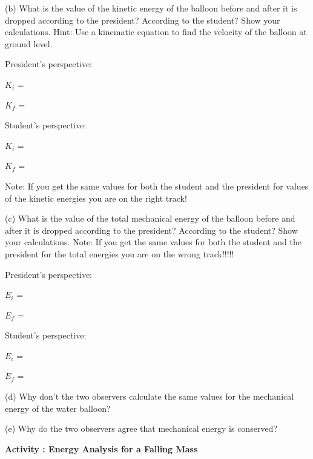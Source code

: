 (b) What is the value of the kinetic energy of the balloon before and after
it is dropped according to the president? According to the student? Show your
calculations. Hint: Use a kinematic equation to find the velocity of the balloon
at ground level.

President's perspective: 
\vspace{5mm}

\( K_{i} \) = 
\vspace{5mm}

\( K_{f} \) =

Student's perspective: 
\vspace{5mm}

\( K_{i} \) = 
\vspace{5mm}

\( K_{f} \) =
\vspace{5mm}

Note: If you get the same values for both the student and the president for
values of the kinetic energies you are on the right track!

(c) What is the value of the total mechanical energy of the balloon before and
after it is dropped according to the president? According to the student? Show
your calculations. Note: If you get the same values for both the student and
the president for the total energies you are on the wrong track!!!!!

President's perspective: 
\vspace{5mm}

\( E_{i} \) = 
\vspace{5mm}

\( E_{f} \) =
\vspace{5mm}

Student's perspective: 
\vspace{5mm}

\( E_{i} \) = 
\vspace{5mm}

\( E_{f} \) =
\vspace{5mm}

(d) Why don't the two observers calculate the same values for the mechanical
energy of the water balloon? 
\vspace{15mm}

\newpage

(e) Why do the two observers agree that mechanical energy is conserved? 
\vspace{15mm}


\textbf{Activity : Energy Analysis for a Falling Mass}

